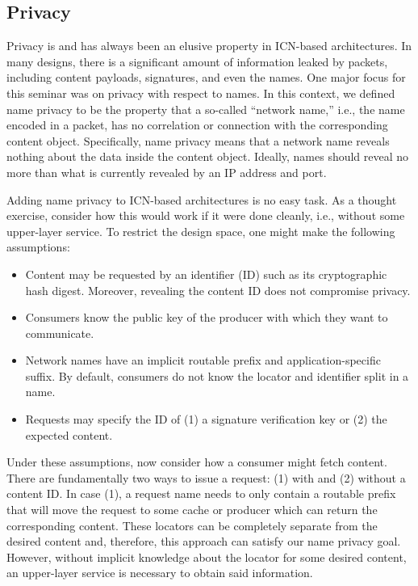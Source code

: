 \subsection{Privacy}
Privacy is and has always been an elusive property in ICN-based architectures.
In many designs, there is a significant amount of information leaked by packets, including
content payloads, signatures, and even the names. One major focus for this seminar
was on privacy with respect to names. In this context, we defined name privacy to be the property
that a so-called ``network name,'' i.e., the name encoded in a packet, has no correlation
or connection with the corresponding content object. Specifically, name privacy means
that a network name reveals nothing about the data inside the content object. Ideally,
names should reveal no more than what is currently revealed by an IP address and port.

Adding name privacy to ICN-based architectures is no easy task. As a thought exercise,
consider how this would work if it were done cleanly, i.e., without some upper-layer
service. To restrict the design space, one might make the following assumptions:
%
\begin{itemize}
\item Content may be requested by an identifier (ID) such as its cryptographic hash digest.
Moreover, revealing the content ID does not compromise privacy.
\item Consumers know the public key of the producer with which they want to communicate.
\item Network names have an implicit routable prefix and application-specific suffix.
By default, consumers do not know the locator and identifier split in a name.
\item Requests may specify the ID of (1) a signature verification key or (2) the expected content.
\end{itemize}
%
Under these assumptions, now consider how a consumer might fetch content.
There are fundamentally two ways to issue a request: (1) with and (2) without a
content ID. In case (1), a request name needs to only contain a routable prefix that will
move the request to some cache or producer which can return the corresponding content.
These locators can be completely separate from the desired content and, therefore, this
approach can satisfy our name privacy goal. However, without implicit knowledge about
the locator for some desired content, an upper-layer service is necessary to obtain said information.

